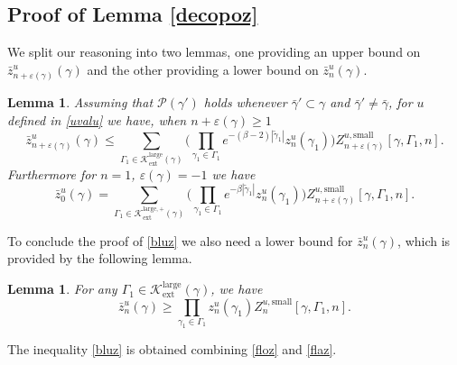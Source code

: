 \documentclass[JEP,XML,SOM,Unicode, NoFloatCountersInSection]{cedram}
\let\mathcal\mathscr
\numberwithin{equation}{section}
\theoremstyle{plain}
\newtheorem{lemma}[theorem]{Lemma}
\theoremstyle{definition}
\newcommand{\ext}{\mathrm{ext}}
\newcommand{\sm}{\mathrm{small}}
\newcommand{\larg}{\mathrm{large}}
\newcommand{\cP}{{\ensuremath{\mathcal P}} }
\newcommand{\cK}{{\ensuremath{\mathcal K}} }
\newcommand{\gb}{\beta}
\newcommand{\gep}{\varepsilon}
\newcommand{\gG}{\Gamma}
\begin{document}
\subsection{Proof of Lemma \ref{decopoz}}

We split our reasoning into two lemmas, one providing an upper bound on $\bar z^{u}_{n+\gep(\gamma)}(\gamma)$ and the other providing a lower bound on
$\bar z^{u}_{n}(\gamma)$.

\begin{lemma}\label{plif}
Assuming that $\cP(\gamma')$ holds whenever $\bar \gamma'\subset \gamma$ and $\bar \gamma'\ne \bar \gamma$,
for $u$ defined in \eqref{uvalu} we have, when $n+\gep(\gamma)\ge 1$
\begin{equation}\label{floz}
\bar z^{u}_{n+\gep(\gamma)}(\gamma)\le \sum_{\gG_1\in \cK^{\larg}_{\ext}(\gamma)}
\biggl(\prod_{\gamma_1\in \gG_1} e^{- (\gb-2) |\tilde \gamma_1|} z^u_{n}(\gamma_1) \biggr)
Z^{u,\sm}_{n+\gep(\gamma)}[\gamma, \gG_1,n].
\end{equation}
Furthermore for $n=1$, $\gep(\gamma)=-1$ we have
\begin{equation*}
\bar z^{u}_{0}(\gamma)= \sum_{\gG_1\in \cK^{\larg,+}_{\ext}(\gamma)}
\biggl(\prod_{\gamma_1\in \gG_1} e^{- \gb |\tilde \gamma_1|} z^u_{n}(\gamma_1) \biggr)
Z^{u,\sm}_{n+\gep(\gamma)}[\gamma, \gG_1,n].
\end{equation*}
\end{lemma}
To conclude the proof of \eqref{bluz} we also need a lower bound for $\bar z^u_n(\gamma)$, which is provided by the following lemma.

\begin{lemma}\label{plof}
For any $\gG_1\in \cK^{\larg}_{\ext}(\gamma)$, we have
\begin{equation}\label{flaz}
\bar z^{u}_{n}(\gamma)\ge \prod_{\gamma_1\in \gG_1} z^u_{n}(\gamma_1)
Z^{u,\sm}_{n}[\gamma, \gG_1,n].
\end{equation}
\end{lemma}
The inequality \eqref{bluz} is obtained combining \eqref{floz} and \eqref{flaz}.
\end{document}
